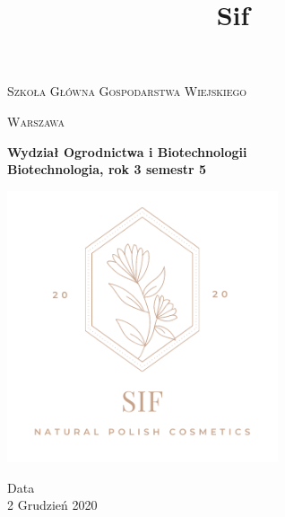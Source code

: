 \documentclass{article}
\title{Sif}
\begin{document}
\begin{titlepage}
	\begin{center}
	{\scshape\huge Szkoła Główna Gospodarstwa Wiejskiego \par}
	\vspace{0.5cm}
	{\scshape\LARGE Warszawa \par}
	\vspace{0.5cm}
	{\LARGE\bfseries Wydział Ogrodnictwa i Biotechnologii \\ Biotechnologia, rok 3 semestr 5 \par}
	{\includegraphics[width=0.6\textwidth]{sif.png}}
	\vfill

\vfill

	{\LARGE Data \\ 2 Grudzień 2020 \par}
	\end{center}
\end{titlepage}

\tableofcontents

\newpage














\end{document}
